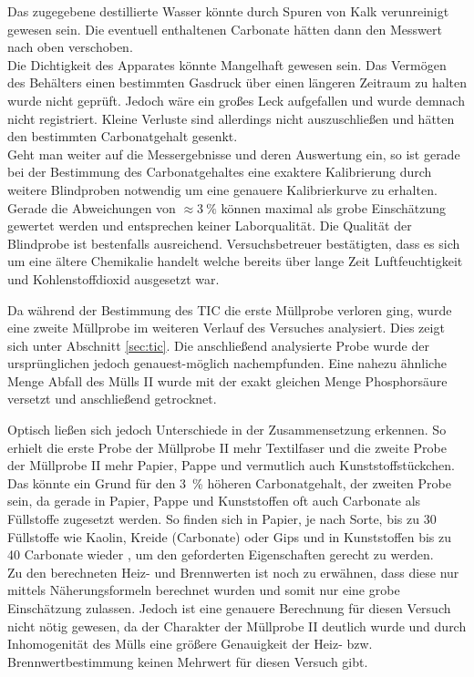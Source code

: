 Das zugegebene destillierte Wasser könnte durch Spuren von Kalk verunreinigt gewesen sein. Die eventuell enthaltenen Carbonate hätten dann den Messwert nach oben verschoben.\\

Die Dichtigkeit des Apparates könnte Mangelhaft gewesen sein. Das Vermögen des Behälters einen bestimmten Gasdruck über einen längeren Zeitraum zu halten wurde nicht geprüft. Jedoch wäre ein großes Leck aufgefallen und wurde demnach nicht registriert. Kleine Verluste sind allerdings nicht auszuschließen und hätten den bestimmten Carbonatgehalt gesenkt.\\

Geht man weiter auf die Messergebnisse und deren Auswertung ein, so ist gerade bei der Bestimmung des Carbonatgehaltes eine exaktere Kalibrierung durch weitere Blindproben notwendig um eine genauere Kalibrierkurve zu erhalten. Gerade die Abweichungen von $\approx \SI{3}{\percent}$ können maximal als grobe Einschätzung gewertet werden und entsprechen keiner Laborqualität. Die Qualität der Blindprobe ist bestenfalls ausreichend. Versuchsbetreuer bestätigten, dass es sich um eine ältere Chemikalie handelt welche bereits über lange Zeit Luftfeuchtigkeit und Kohlenstoffdioxid ausgesetzt war. \linebreak

Da während der Bestimmung des TIC die erste Müllprobe verloren ging, wurde eine zweite Müllprobe im weiteren Verlauf des Versuches analysiert. Dies zeigt sich unter Abschnitt \ref{sec:tic}. Die anschließend analysierte Probe wurde der ursprünglichen jedoch genauest-möglich nachempfunden. Eine nahezu ähnliche Menge Abfall des Mülls II wurde mit der exakt gleichen Menge Phosphorsäure versetzt und anschließend getrocknet.\linebreak

Optisch ließen sich jedoch Unterschiede in der Zusammensetzung erkennen. So erhielt die erste Probe der Müllprobe II mehr Textilfaser und die zweite Probe der Müllprobe II mehr Papier, Pappe und vermutlich auch Kunststoffstückchen.\linebreak
Das könnte ein Grund für den \SI{3}{\percent} höheren Carbonatgehalt, der zweiten Probe sein, da gerade in Papier, Pappe und Kunststoffen oft auch Carbonate als Füllstoffe zugesetzt werden. So finden sich in Papier, je nach Sorte, bis zu \SI{30}{\mpercent} Füllstoffe wie Kaolin, Kreide (Carbonate) oder Gips \cite{Wikipedia.21.11.2019} und in Kunststoffen bis zu  \SI{40}{\mpercent} Carbonate wieder \cite{PolymerServiceGmbHMerseburg.13.08.2019}, um den geforderten Eigenschaften gerecht zu werden.\\
Zu den berechneten Heiz- und Brennwerten ist noch zu erwähnen, dass diese nur mittels Näherungsformeln berechnet wurden und somit nur eine grobe Einschätzung zulassen. Jedoch ist eine genauere Berechnung für diesen Versuch nicht nötig gewesen, da der Charakter der Müllprobe II deutlich wurde und durch Inhomogenität des Mülls eine größere Genauigkeit der Heiz- bzw. Brennwertbestimmung keinen Mehrwert für diesen Versuch gibt.\\ \\

